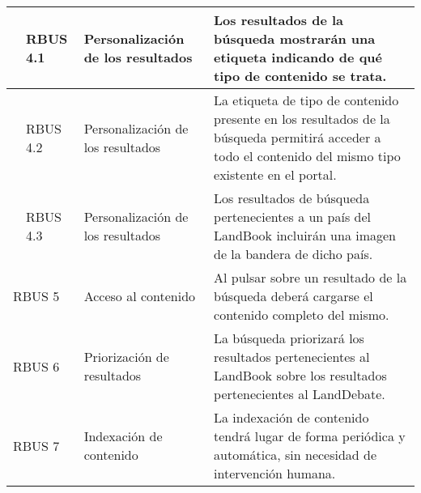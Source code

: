 \begin{longtable}[c]{|p{1mm}|p{14mm}|p{30mm}|p{90mm}|}
\hline
& RBUS 4.1 & Personalización de los resultados & Los resultados de la búsqueda mostrarán una etiqueta indicando de qué tipo de contenido se trata. \\
\hline
& RBUS 4.2 & Personalización de los resultados & La etiqueta de tipo de contenido presente en los resultados de la búsqueda permitirá acceder a todo el contenido del mismo tipo existente en el portal. \\
\hline
& RBUS 4.3 & Personalización de los resultados & Los resultados de búsqueda pertenecientes a un país del LandBook incluirán una imagen de la bandera de dicho país. \\
\hline
\multicolumn{2}{|l|}{RBUS 5}  & Acceso al contenido & Al pulsar sobre un resultado de la búsqueda deberá cargarse el contenido completo del mismo. \\
\hline
\multicolumn{2}{|l|}{RBUS 6}  & Priorización de resultados & La búsqueda priorizará los resultados pertenecientes al LandBook sobre los resultados pertenecientes al LandDebate. \\
\hline
\multicolumn{2}{|l|}{RBUS 7}  & Indexación de contenido & La indexación de contenido tendrá lugar de forma periódica y automática, sin necesidad de intervención humana. \\
\hline
\hline

 \end{longtable}
 
 
 
 
 
 
 
 
 
 
 
 
 
 
 
 
 
 
 
 
 